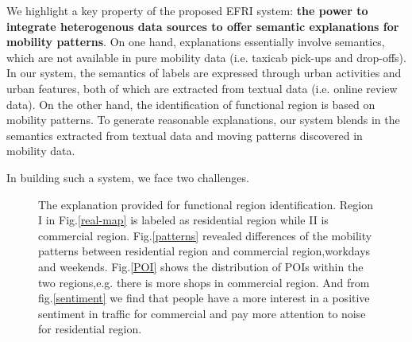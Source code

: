 \documentclass[runningheads]{llncs}
\begin{document}
We highlight a key property of the proposed EFRI system: \textbf{the power to integrate heterogenous data sources to offer semantic explanations for mobility patterns}. On one hand, explanations essentially involve semantics, which are not available in pure mobility data (i.e. taxicab pick-ups and drop-offs). In our system, the semantics of labels are expressed through urban activities and urban features, both of which are extracted from textual data (i.e. online review data). On the other hand, the identification of functional region is based on mobility patterns. To generate reasonable explanations, our system blends in the semantics extracted from textual data and moving patterns discovered in mobility data. 

In building such a system, we face two challenges.

\begin{figure}
\centering
{}
\caption{The explanation provided for functional region identification.
Region I in Fig.\ref{real-map} is labeled as residential region while II is commercial region.
Fig.\ref{patterns} revealed differences of the mobility patterns between residential region and commercial region,workdays and weekends.
Fig.\ref{POI} shows the distribution of POIs within the two regions,e.g. there is more shops in commercial region.
And from fig.\ref{sentiment} we find that people have a more interest in a positive sentiment in traffic for commercial and pay more attention to noise for residential region.}
\label{explanation-example} %
\end{figure}
\end{document}
